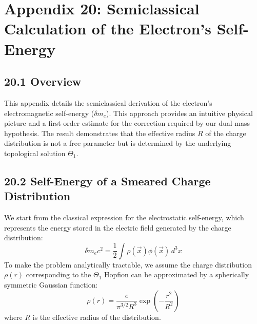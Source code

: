 \documentclass[12pt, a4paper]{article}
\begin{document}
\appendix
\section*{Appendix 20: Semiclassical Calculation of the Electron's Self-Energy}

\subsection*{20.1 Overview}
This appendix details the semiclassical derivation of the electron's electromagnetic self-energy (\(\delta m_e\)). This approach provides an intuitive physical picture and a first-order estimate for the correction required by our dual-mass hypothesis. The result demonstrates that the effective radius \(R\) of the charge distribution is not a free parameter but is determined by the underlying topological solution \(\Theta_1\).

\subsection*{20.2 Self-Energy of a Smeared Charge Distribution}

We start from the classical expression for the electrostatic self-energy, which represents the energy stored in the electric field generated by the charge distribution:
\begin{equation}
    \delta m_e c^2 = \frac{1}{2} \int \rho(\vec{x}) \phi(\vec{x})\, d^3x
\end{equation}
To make the problem analytically tractable, we assume the charge distribution \( \rho(r) \) corresponding to the \(\Theta_1\) Hopfion can be approximated by a spherically symmetric Gaussian function:
\begin{equation}
    \rho(r) = \frac{e}{\pi^{3/2} R^3} \exp\left(-\frac{r^2}{R^2}\right)
\end{equation}
where \(R\) is the effective radius of the distribution.
\end{document}
